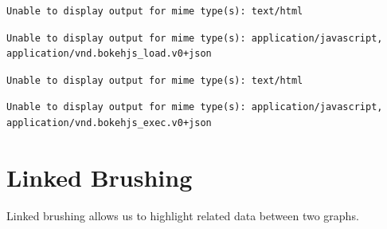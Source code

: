 \documentclass[
  letterpaper,
  DIV=11,
  numbers=noendperiod]{scrreprt}
\begin{document}
\begin{verbatim}
Unable to display output for mime type(s): text/html
\end{verbatim}

\begin{verbatim}
Unable to display output for mime type(s): application/javascript, application/vnd.bokehjs_load.v0+json
\end{verbatim}

\begin{verbatim}
Unable to display output for mime type(s): text/html
\end{verbatim}

\begin{verbatim}
Unable to display output for mime type(s): application/javascript, application/vnd.bokehjs_exec.v0+json
\end{verbatim}

\hypertarget{linked-brushing}{%
\section{Linked Brushing}\label{linked-brushing}}

Linked brushing allows us to highlight related data between two graphs.
\end{document}
